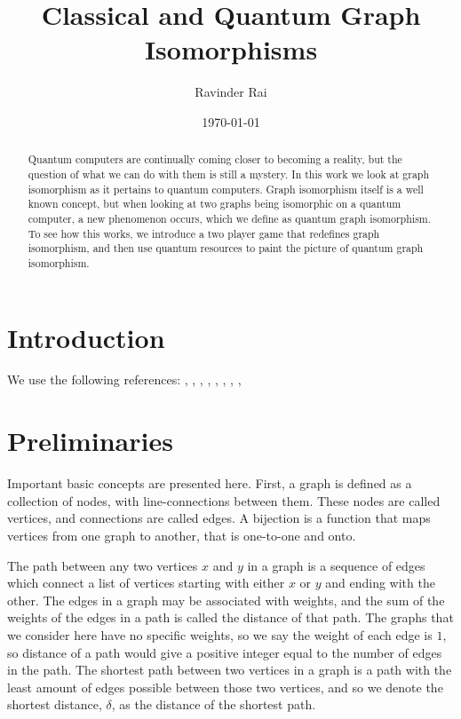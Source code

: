 \documentclass[12pt]{article}
\title{\textbf{Classical and Quantum Graph Isomorphisms}}
\author{Ravinder Rai}
\date{\today}
\begin{document}
 

\maketitle

\begin{abstract}
Quantum computers are continually coming closer to becoming a reality, but the question of what we can do with them is still a mystery. In this work we look at graph isomorphism as it pertains to quantum computers. Graph isomorphism itself is a well known concept, but when looking at two graphs being isomorphic on a quantum computer, a new phenomenon occurs, which we define as quantum graph isomorphism. To see how this works, we introduce a two player game that redefines graph isomorphism, and then use quantum resources to paint the picture of quantum graph isomorphism. 
\end{abstract}

\section{Introduction}
\label{sec:intro}

We use the following references: \cite{shortest}, \cite{laura}, \cite{comb}, \cite{musto2018}, \cite{QuanPerm}, \cite{GraphHom}, \cite{QuanMonad}, \cite{QuantumMagic}, \cite{Binary}

\section{Preliminaries} \label{prelim}
Important basic concepts are presented here. First, a graph is defined as a collection of nodes, with line-connections between them. These nodes are called vertices, and connections are called edges. A bijection is a function that maps vertices from one graph to another, that is one-to-one and onto.

The path between any two vertices $x$ and $y$ in a graph is a sequence of edges which connect a list of vertices starting with either $x$ or $y$ and ending with the other. The edges in a graph may be associated with weights, and the sum of the weights of the edges in a path is called the distance of that path. The graphs that we consider here have no specific weights, so we say the weight of each edge is $1$, so distance of a path would give a positive integer equal to the number of edges in the path. The shortest path between two vertices in a graph is a path with the least amount of edges possible between those two vertices, and so we denote the shortest distance, $\delta$, as the distance of the shortest path. 
\end{document}
